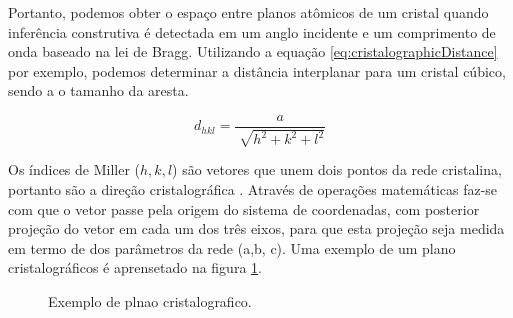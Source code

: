 Portanto, podemos obter o espaço entre planos atômicos de um cristal quando
inferência construtiva é detectada em um anglo incidente e um comprimento de onda
baseado na lei de Bragg. Utilizando a equação \ref{eq:cristalographicDistance} por exemplo,
podemos determinar a distância interplanar para um cristal cúbico, sendo
a o tamanho da aresta.

\begin{equation}\label{eq:cristalographicDistance}
        d_{hkl} = \frac{a}{\sqrt[]{h^2+k^2+l^2}}        
\end{equation}

Os índices de Miller ($h, k, l$) são vetores que unem dois pontos da rede cristalina,
portanto são a direção cristalográfica \cite{pptDifracaoRaioXAntonioCarlos}. Através
de operações matemáticas faz-se com que o vetor passe pela origem do sistema de coordenadas,
com posterior projeção do vetor em cada um dos três eixos, para que esta projeção seja
medida em termo de dos parâmetros da rede (a,b, c). Uma exemplo de um plano cristalográficos
é aprensetado na figura \ref{figure:cristalographicPlane}.

\begin{figure}[ht]
    \center
    \begin{minipage}{8cm}
     \caption{Exemplo de plnao cristalografico.}\label{figure:cristalographicPlane} 
     \end{minipage}
\end{figure}

